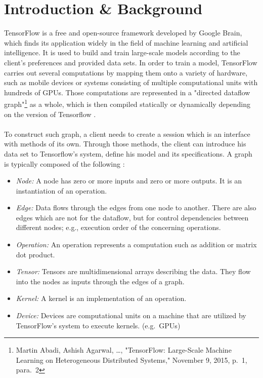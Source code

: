 \documentclass[ieeetran]{article}
\begin{document}
\section{Introduction \& Background} %
\label{sec:introduction}
TensorFlow is a free and open-source framework developed by Google Brain, which finds its application widely in the field of machine learning and artificial intelligence. It is used to build and train large-scale models according to the client's preferences and provided data sets. In order to train a model, TensorFlow carries out several computations by mapping them onto a variety of hardware, such as mobile devices or systems consisting of multiple computational units with hundreds of GPUs. Those computations are represented in a "directed dataflow graph"\footnote{Martin Abadi, Ashish Agarwal, \ldots, "TensorFlow: Large-Scale Machine Learning on Heterogeneous Distributed Systems," November 9, 2015, p.\ 1, para.\ 2} as a whole, which is then compiled statically or dynamically depending on the version of Tensorflow \cite{first}. 
\\ \\To construct such graph, a client needs to create a session which is an interface with methods of its own. Through those methods, the client can introduce his data set to Tensorflow's system, define his model and its specifications. A graph is typically composed of the following \cite{first}:
\begin{itemize}
  \item \textit{Node:} A node has zero or more inputs and zero or more outputs. It is an instantiation of an operation.
\item \textit{Edge:} Data flows through the edges from one node to another. There are also edges which are not for the dataflow, but for control dependencies between different nodes; e.g., execution order of the concerning operations.
\item \textit{Operation:} An operation represents a computation such as addition or matrix dot product.
\item \textit{Tensor:} Tensors are multidimensional arrays describing the data. They flow into the nodes as inputs through the edges of a graph.
\item \textit{Kernel:} A kernel is an implementation of an operation.
\item \textit{Device:} Devices are computational units on a machine that are utilized by TensorFlow's system to execute kernels. (e.g.\ GPUs)
\end{itemize}
\end{document}
